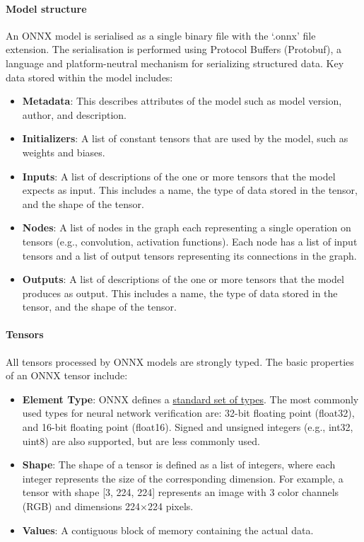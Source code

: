 \paragraph{Model structure} 

An ONNX model is serialised as a single binary file with the `.onnx' file extension. The serialisation is performed using Protocol Buffers (Protobuf), a language and platform-neutral mechanism for serializing structured data. Key data stored within the model includes:
\begin{itemize}
	\item \textbf{Metadata}: This describes attributes of the model such as model version, author, and description.
	\item \textbf{Initializers}: A list of constant tensors that are used by the model, such as weights and biases.
	\item \textbf{Inputs}: A list of descriptions of the one or more tensors that the model expects as input. This includes a name, the type of data stored in the tensor, and the shape of the tensor.
	\item \textbf{Nodes}: A list of nodes in the graph each representing a single operation on  tensors (e.g., convolution, activation functions). Each node has a list of input tensors and a list of output tensors representing its connections in the graph.
	\item \textbf{Outputs}: A list of descriptions of the one or more tensors that the model produces as output. This includes a name, the type of data stored in the tensor, and the shape of the tensor.
\end{itemize}


\paragraph{Tensors}
All tensors processed by ONNX models are strongly typed. The basic properties of an ONNX tensor include:
\begin{itemize}
	\item \textbf{Element Type}: ONNX defines a \href{https://onnx.ai/onnx/repo-docs/IR.html#tensor-element-types}{standard set of types}. 
	The most commonly used types for neural network verification are: 32-bit floating point (float32), and 16-bit floating point (float16). Signed and unsigned integers (e.g., int32, uint8) are also supported, but are less commonly used.
	\item \textbf{Shape}: The shape of a tensor is defined as a list of integers, where each integer represents the size of the corresponding dimension. For example, a tensor with shape [3, 224, 224] 
	represents an image with 3 color channels (RGB) and dimensions 224\(\times\)224 pixels.
	\item \textbf{Values}: A contiguous block of memory containing the actual data.
\end{itemize}

